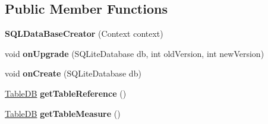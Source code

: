 \subsection*{Public Member Functions}
\begin{DoxyCompactItemize}
\item 
\hypertarget{classcom_1_1qualoutdoor_1_1recorder_1_1persistent_1_1SQLDataBaseCreator_a1186cd8d2e2c7394a03872ce341789ff}{{\bfseries S\-Q\-L\-Data\-Base\-Creator} (Context context)}\label{classcom_1_1qualoutdoor_1_1recorder_1_1persistent_1_1SQLDataBaseCreator_a1186cd8d2e2c7394a03872ce341789ff}

\item 
\hypertarget{classcom_1_1qualoutdoor_1_1recorder_1_1persistent_1_1SQLDataBaseCreator_a78e30e7b09276b95e58f9f344dfd4b53}{void {\bfseries on\-Upgrade} (S\-Q\-Lite\-Database db, int old\-Version, int new\-Version)}\label{classcom_1_1qualoutdoor_1_1recorder_1_1persistent_1_1SQLDataBaseCreator_a78e30e7b09276b95e58f9f344dfd4b53}

\item 
\hypertarget{classcom_1_1qualoutdoor_1_1recorder_1_1persistent_1_1SQLDataBaseCreator_a2c77cc28b617bb6518cb55d994e50fe8}{void {\bfseries on\-Create} (S\-Q\-Lite\-Database db)}\label{classcom_1_1qualoutdoor_1_1recorder_1_1persistent_1_1SQLDataBaseCreator_a2c77cc28b617bb6518cb55d994e50fe8}

\item 
\hypertarget{classcom_1_1qualoutdoor_1_1recorder_1_1persistent_1_1SQLDataBaseCreator_a43827d1dba52d81bca62a65ec0bf91d7}{\hyperlink{classcom_1_1qualoutdoor_1_1recorder_1_1persistent_1_1TableDB}{Table\-D\-B} {\bfseries get\-Table\-Reference} ()}\label{classcom_1_1qualoutdoor_1_1recorder_1_1persistent_1_1SQLDataBaseCreator_a43827d1dba52d81bca62a65ec0bf91d7}

\item 
\hypertarget{classcom_1_1qualoutdoor_1_1recorder_1_1persistent_1_1SQLDataBaseCreator_a85792642cddb0912c69ffa443adf891b}{\hyperlink{classcom_1_1qualoutdoor_1_1recorder_1_1persistent_1_1TableDB}{Table\-D\-B} {\bfseries get\-Table\-Measure} ()}\label{classcom_1_1qualoutdoor_1_1recorder_1_1persistent_1_1SQLDataBaseCreator_a85792642cddb0912c69ffa443adf891b}

\end{DoxyCompactItemize}
